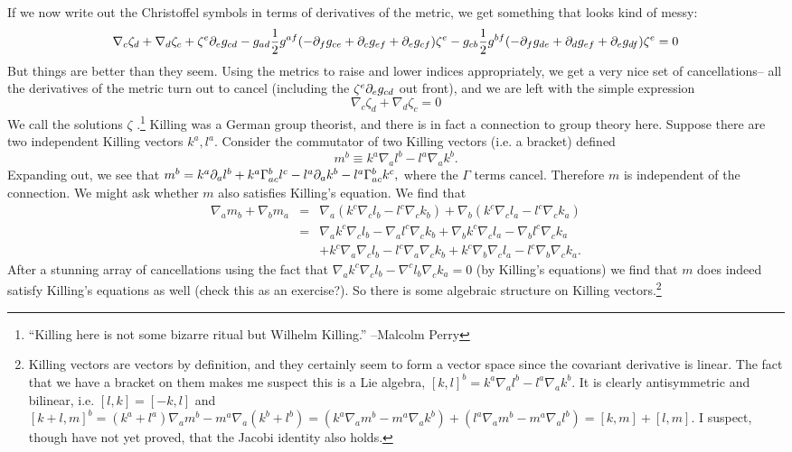 If we now write out the Christoffel symbols in terms of derivatives of the metric, we get something that looks kind of messy:
$$\nabla_c \zeta_d +\nabla_d \zeta_c +\zeta^e \partial_e g_{cd} -g_{ad} \frac{1}{2} g^{af}(-\partial_f g_{ce}+\partial_c g_{ef} +\partial_e g_{cf})\zeta^e - g_{cb}\frac{1}{2} g^{bf}(-\partial_f g_{de}+\partial_d g_{ef}+\partial_e g_{df})\zeta^e=0$$
But things are better than they seem. Using the metrics to raise and lower indices appropriately, we get a very nice set of cancellations-- all the derivatives of the metric turn out to cancel (including the $\zeta^e \partial_e g_{cd}$ out front), and we are left with the simple expression
$$\nabla_c \zeta_d +\nabla_d \zeta_c=0$$
We call the solutions $\zeta$ .\footnote{``Killing here is not some bizarre ritual but Wilhelm Killing.'' --Malcolm Perry} Killing was a German group theorist, and there is in fact a connection to group theory here. Suppose there are two independent Killing vectors $k^a,l^a$. Consider the commutator of two Killing vectors (i.e. a bracket) defined
$$m^b\equiv k^a\nabla_a l^b - l^a \nabla_a k^b.$$
Expanding out, we see that
$m^b=k^a\partial_a l^b+ k^a\Gamma^b_{ac} l^c - l^a \partial_a k^b - l^a \Gamma^b_{ac} k^c,$
where the $\Gamma$ terms cancel. Therefore $m$ is independent of the connection. We might ask whether $m$ also satisfies Killing's equation. We find that
\begin{eqnarray*}
\nabla_a m_b +\nabla_b m_a &=& \nabla_a (k^c \nabla_c l_b - l^c \nabla_c k_b)+\nabla_b (k^c \nabla_c l_a -l^c \nabla_c k_a)\\
&=& \nabla_a k^c \nabla_c l_b -\nabla_a l^c \nabla_c k_b + \nabla_b k^c \nabla_c l_a -\nabla_b l^c \nabla_c k_a\\
&&+k^c \nabla_a \nabla_c l_b - l^c \nabla_a \nabla_c k_b +k^c \nabla_b \nabla_c l_a - l^c \nabla_b \nabla_c k_a.
\end{eqnarray*}
After a stunning array of cancellations using the fact that $\nabla_a k^c \nabla_c l_b - \nabla^c l_b \nabla_c k_a=0$ (by Killing's equations) we find that $m$ does indeed satisfy Killing's equations as well (check this as an exercise?). So there is some algebraic structure on Killing vectors.\footnote{Killing vectors are vectors by definition, and they certainly seem to form a vector space since the covariant derivative is linear. The fact that we have a bracket on them makes me suspect this is a Lie algebra, $[k,l]^b=k^a\nabla_a l^b - l^a \nabla_a k^b$. It is clearly antisymmetric and bilinear, i.e. $[l,k]=[-k,l]$ and $[k+l,m]^b=(k^a+l^a)\nabla_a m^b -m^a \nabla_a (k^b+l^b)=(k^a \nabla_a m^b - m^a \nabla_a k^b)+(l^a \nabla_a m^b - m^a \nabla_a l^b)=[k,m]+[l,m]$. I suspect, though have not yet proved, that the Jacobi identity also holds.}

